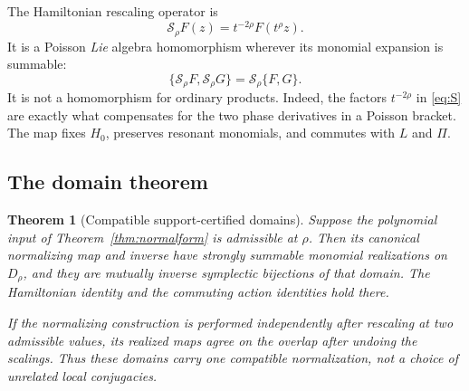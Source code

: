 \documentclass[11pt,letterpaper]{article}
\numberwithin{equation}{section}
\newtheorem{theorem}{Theorem}[section]
\theoremstyle{definition}
\theoremstyle{remark}
\begin{document}
The Hamiltonian rescaling operator is
\begin{equation}\label{eq:S}
 \mathscr S_\rho F(z)=t^{-2\rho}F(t^\rho z).
\end{equation}
It is a Poisson \emph{Lie} algebra homomorphism wherever its monomial
expansion is summable:
\begin{equation}\label{eq:scalepb}
 \{\mathscr S_\rho F,\mathscr S_\rho G\}
       =\mathscr S_\rho\{F,G\}.
\end{equation}
It is not a homomorphism for ordinary products. Indeed, the factors
$t^{-2\rho}$ in \eqref{eq:S} are exactly what compensates for the two
phase derivatives in a Poisson bracket. The map fixes $H_0$, preserves
resonant monomials, and commutes with $L$ and $\Pi$.

\subsection{The domain theorem}
\begin{theorem}[Compatible support-certified domains]\label{thm:rescale}
Suppose the polynomial input of Theorem~\ref{thm:normalform} is admissible
at $\rho$. Then its canonical normalizing map and inverse have strongly
summable monomial realizations on $D_\rho$, and they are mutually inverse
symplectic bijections of that domain. The Hamiltonian identity and the
commuting action identities hold there.

If the normalizing construction is performed independently after rescaling
at two admissible values, its realized maps agree on the overlap after
undoing the scalings. Thus these domains carry one compatible normalization,
not a choice of unrelated local conjugacies.
\end{theorem}
\end{document}
